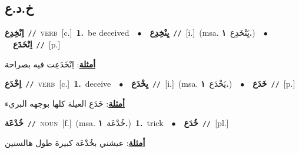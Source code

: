 \documentclass[10pt,a4paper,twoside]{article} %
\begin{document}
\begin{multicols}{2}
{{{{{{{{{\vspace{-3mm}
\subsection*{\color{blue}\foreignlanguage{arabic}{خ.د.ع}\color{blue}{}} 

{\setlength\topsep{0pt}\textbf{\foreignlanguage{arabic}{اِنْخِدِع}}\ {\color{gray}\texttt{//}\color{black}}\ \textsc{verb}\ [c.]\ \textbf{1.}~be deceived\ \ $\bullet$\ \ \setlength\topsep{0pt}\textbf{\foreignlanguage{arabic}{يِنْخِدِع}}\ {\color{gray}\texttt{//}\color{black}}\ [i.]\ \color{gray}(msa. \foreignlanguage{arabic}{يَِنْخَدِع}~\foreignlanguage{arabic}{\textbf{١.}})\color{black}\ \ $\bullet$\ \ \setlength\topsep{0pt}\textbf{\foreignlanguage{arabic}{اِنْخَدَع}}\ {\color{gray}\texttt{//}\color{black}}\ [p.]\  \begin{flushright}\color{gray}\foreignlanguage{arabic}{\textbf{\underline{\foreignlanguage{arabic}{أمثلة}}}: اِنْخَدَعِت فيه بصراحة}\end{flushright}\color{black}} \vspace{2mm}

{\setlength\topsep{0pt}\textbf{\foreignlanguage{arabic}{اِخْدَع}}\ {\color{gray}\texttt{//}\color{black}}\ \textsc{verb}\ [c.]\ \textbf{1.}~deceive\ \ $\bullet$\ \ \setlength\topsep{0pt}\textbf{\foreignlanguage{arabic}{يِخْدَع}}\ {\color{gray}\texttt{//}\color{black}}\ [i.]\ \color{gray}(msa. \foreignlanguage{arabic}{يَخْدَع}~\foreignlanguage{arabic}{\textbf{١.}})\color{black}\ \ $\bullet$\ \ \setlength\topsep{0pt}\textbf{\foreignlanguage{arabic}{خَدَع}}\ {\color{gray}\texttt{//}\color{black}}\ [p.]\  \begin{flushright}\color{gray}\foreignlanguage{arabic}{\textbf{\underline{\foreignlanguage{arabic}{أمثلة}}}: خَدَع العيلة كلها بوجهه البريء}\end{flushright}\color{black}} \vspace{2mm}

{\setlength\topsep{0pt}\textbf{\foreignlanguage{arabic}{خُدْعَة}}\ {\color{gray}\texttt{//}\color{black}}\ \textsc{noun}\ [f.]\ \color{gray}(msa. \foreignlanguage{arabic}{خُدْعَة}~\foreignlanguage{arabic}{\textbf{١.}})\color{black}\ \textbf{1.}~trick\ \ $\bullet$\ \ \setlength\topsep{0pt}\textbf{\foreignlanguage{arabic}{خُدَع}}\ {\color{gray}\texttt{//}\color{black}}\ [pl.]\  \begin{flushright}\color{gray}\foreignlanguage{arabic}{\textbf{\underline{\foreignlanguage{arabic}{أمثلة}}}: عيشني بخُدْعَة كبيرة طول هالسنين}\end{flushright}\color{black}} \vspace{2mm}

}}}}}}}}}
\end{multicols}
\end{document}
